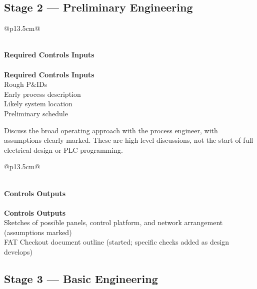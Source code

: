 \subsection{Stage 2 --- Preliminary Engineering}

\begin{longtable}{@{}p{13.5cm}@{}}
\caption{Stage 2 --- Required Controls Inputs}\label{tab:stage2-inputs} \\
\toprule
{}\textbf{Required Controls Inputs} \\
\midrule
\endfirsthead
{} \\
\toprule
{}\textbf{Required Controls Inputs} \\
\midrule
\endhead
Rough P\&IDs \\
Early process description \\
Likely system location \\
Preliminary schedule \\
\bottomrule
\end{longtable}

Discuss the broad operating approach with the process engineer, with assumptions clearly marked. These are high-level discussions, not the start of full electrical design or PLC programming.

\begin{longtable}{@{}p{13.5cm}@{}}
\caption{Stage 2 --- Controls Outputs}\label{tab:stage2-outputs} \\
\toprule
{}\textbf{Controls Outputs} \\
\midrule
\endfirsthead
{} \\
\toprule
{}\textbf{Controls Outputs} \\
\midrule
\endhead
Sketches of possible panels, control platform, and network arrangement (assumptions marked) \\
FAT Checkout document outline (started; specific checks added as design develops) \\
\bottomrule
\end{longtable}

\subsection{Stage 3 --- Basic Engineering}

